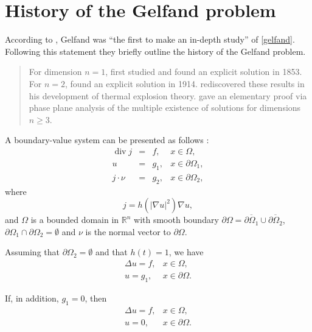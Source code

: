 \section{History of the Gelfand problem}
According to \citet[p. 46]{bebernes1989mathematical}, Gelfand
was ``the first to make an in-depth study'' of \eqref{gelfand}. Following this
statement
they briefly outline the history of the Gelfand problem.
\begin{quote}
  For dimension $n=1$, \citet{liouville1853sur} first studied and
  found an explicit solution in 1853. For $n=2$, \citet{bratu1914sur}
  found an explicit solution in 1914.
  \citet{frankkamanetski1955diffusion}
  rediscovered these results in his development of thermal explosion theory.
  \citet{joseph1973quasilinear} gave an elementary proof via
  phase plane analysis of the multiple existence of solutions for dimensions
  $n\geq 3$.
\end{quote}
A boundary-value system can be presented as follows
\citep{zeidler1988nonlinear}:
\begin{equation*}
  \begin{array}{rcll}
    \operatorname{div} j& = &f, &x\in\Omega ,\\
    u& = & g_1, & x\in\partial\Omega_1 , \\
    j \cdot \nu & = & g_2, & x\in\partial\Omega_2 ,
  \end{array}
\end{equation*}
where
\begin{equation*}
  j = h(|\nabla u|^2) \nabla u,
\end{equation*}
and $\Omega$ is a bounded domain in ${\mathbb R}^n$ with smooth boundary
$\partial\Omega = \overline{\partial\Omega_1}\cup \overline{\partial\Omega_2}$,
$\partial\Omega_1 \cap \partial\Omega_2 = \emptyset$ and $\nu$ is the normal
vector to $\partial\Omega$.
\begin{lemma}
  Assuming that $\partial\Omega_2 = \emptyset$ and that $h(t) = 1$, we have
  \[
    \begin{array}{lr}
      \Delta u = f, & x\in\Omega ,\\
      u =  g_1, & x\in\partial\Omega .
    \end{array}
  \]


\end{lemma}


\begin{corollary}
  If, in addition, $g_1 = 0$, then
  \[
    \begin{array}{lr}
      \Delta u = f, & x\in\Omega ,\\
      u =  0, & x\in\partial\Omega .
    \end{array}
  \]


\end{corollary}


